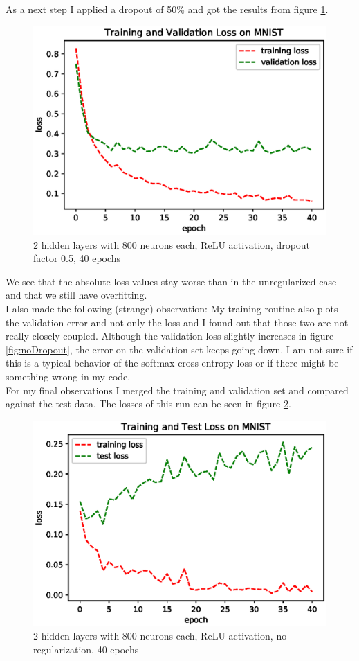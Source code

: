 \documentclass{scrartcl}
\begin{document}
As a next step I applied a dropout of 50\% and got the results from figure \ref{fig:withDropout}. 
\begin{figure}
	\centering
	\includegraphics[scale=0.7]{with_dropout.eps}
	\caption{2 hidden layers with 800 neurons each, ReLU activation, dropout factor 0.5, 40 epochs}
	\label{fig:withDropout}
\end{figure}
We see that the absolute loss values stay worse than in the unregularized case and that we still have overfitting. \\
I also made the following (strange) observation:
My training routine also plots the validation error and not only the loss and I found out that those two are not really closely coupled.
Although the validation loss slightly increases in figure \ref{fig:noDropout}, the error on the validation set keeps going down. I am not sure if this is a typical behavior of the softmax cross entropy loss or if there might be something wrong in my code. \\
For my final observations I merged the training and validation set and compared against the test data. The losses of this run can be seen in figure \ref{fig:finalResults}.
\begin{figure}
	\centering
	\includegraphics[scale=0.7]{test_result.eps}
	\caption{2 hidden layers with 800 neurons each, ReLU activation, no regularization, 40 epochs}
	\label{fig:finalResults}
\end{figure}
\end{document}
